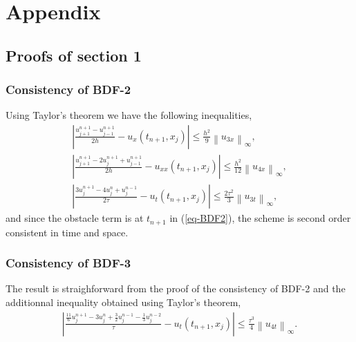\documentclass[12pt,a4paper]{article}
\newcommand{\ninf}[1]{\left\| {#1} \right\|_\infty}
\newcommand{\abs}[1]{\left\vert {#1} \right\vert}
\begin{document}
\newpage
\section{Appendix}

	\subsection{Proofs of section 1}
	
		\subsubsection{Consistency of BDF-2}

Using Taylor's theorem we have the following inequalities,
\begin{align*}
\abs{ \frac{u_{j+1}^{n+1}-u_{j-1}^{n+1}}{2h} - u_x(t_{n+1},x_j) } \leq \frac{h^2}{9} \ninf{u_{3x}}, \\
\abs{ \frac{u_{j+1}^{n+1}-2u_{j}^{n+1}+u_{j-1}^{n+1}}{2h} - u_{xx}(t_{n+1},x_j) } \leq \frac{h^2}{12} \ninf{u_{4x}}, \\
\abs{ \frac{3u_{j}^{n+1} - 4u_{j}^{n} + u_{j}^{n-1}}{2 \tau} - u_t(t_{n+1},x_j) } \leq \frac{2 \tau^2}{3} \ninf{u_{3t}},
\end{align*}
and since the obstacle term is at $t_{n+1}$ in (\ref{eq-BDF2}), the scheme is second order consistent in time and space.

		\subsubsection{Consistency of BDF-3}

The result is straighforward from the proof of the consistency of BDF-2 and the additionnal inequality obtained using Taylor's theorem,
\begin{align*}
\abs{ \frac{\frac{11}{6} u_j^{n+1} - 3 u_j^n + \frac{3}{2} u_j^{n-1} - \frac{1}{3} u_j^{n-2}}{\tau} - u_t(t_{n+1},x_j) } \leq \frac{\tau^3}{4} \ninf{u_{4t}}.
\end{align*}



\newpage


\end{document}
